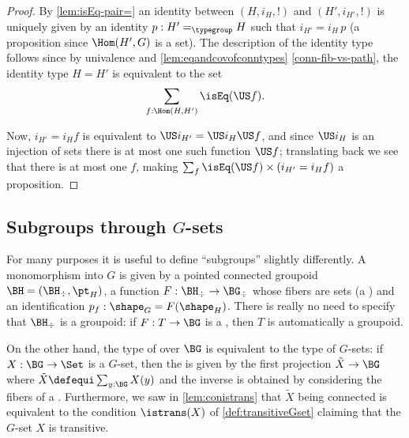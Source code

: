 \begin{proof}
By \cref{lem:isEq-pair=} an identity between $(H,i_H,!)$ and $(H',i_{H'},!)$ is uniquely given by an identity $p:H'=_{\typegroup}H$ such that $i_{H'}=i_H\,p$ (a proposition since $\Hom(H',G)$ is a set).
The description of the identity type follows since by univalence and \cref{lem:eqandcovofconntypes} \cref{conn-fib-vs-path}, %
the identity type $H=H'$ is equivalent to the set
$$\sum_{f:\Hom(H,H')}\isEq(\US f).$$

Now, $i_{H'}=i_Hf$ is equivalent to $\US i_{H'}=\US i_H \US f$, and since $\US i_H$ is an injection of sets there is at most one such function $\US f$; translating back we see that there is at most one $f$, making $\sum_{f%
}\isEq(\US f)\times (i_{H'}=i_H f)$ a proposition.
\end{proof}

\subsection{Subgroups through $G$-sets}

For many purposes it is useful to define ``subgroups'' slightly differently.
A monomorphism into $G$ is given by a pointed connected groupoid  $\BH=(\BH_\div,\pt_H)$, a function $F:\BH_\div\to\BG_\div$ whose fibers are sets (a \covering) and an identification $p_f:\shape_G=F(\shape_H)$.  There is really no need to specify that $\BH_\div$ is a groupoid: if $F:T\to \BG$ is a \covering, then $T$ is automatically a groupoid.

On the other hand,  the type of \coverings over $\BG$ is equivalent to the type of $G$-sets: if $X:\BG\to\Set$ is a $G$-set, then the \covering is given by the first projection $\tilde X\to \BG$ where $\tilde X\defequi\sum_{y:\BG}X(y)$ and the inverse is obtained by considering the fibers of a \covering.  Furthermore, we saw in \cref{lem:conistrans} that $\tilde X$ being connected is equivalent to the condition $\istrans(X)$ of \cref{def:transitiveGset} claiming that the $G$-set $X$ is transitive.


